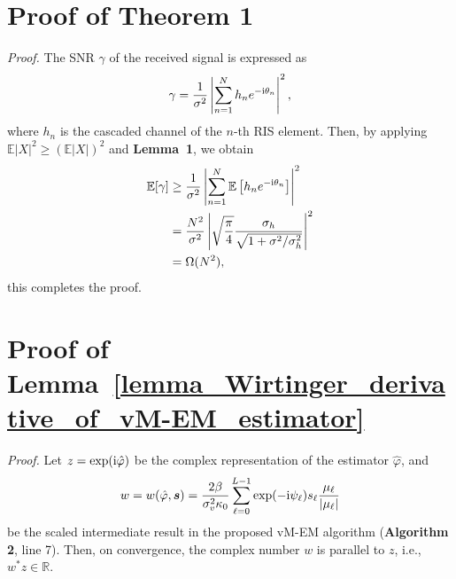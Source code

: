 \documentclass[a4paper,12pt]{article}
\def \ri {{\rm i}}
\begin{document}
\section{Proof of Theorem 1}
{\it {Proof.}} The SNR $\gamma$ of the received signal is expressed as 
\begin{equation}
    \gamma = \frac{1}{\sigma^2}\left| \sum_{n=1}^{N}h_n e^{-\ri \theta_n} \right|^2,
\end{equation}
where $h_n$ is the cascaded channel of the $n$-th RIS element. Then, by applying $\mathbb{E}|X|^2\geq (\mathbb{E}|X|)^2$ and {\bf Lemma~1}, we obtain 
\begin{equation}
    \begin{aligned}
    \mathbb{E}[\gamma] &\geq \frac{1}{\sigma^2}\left| \sum_{n=1}^{N}\mathbb{E}\left[h_n e^{-\ri \theta_n}\right] \right|^2 \\
    &= \frac{N^2}{\sigma^2} \left| \sqrt{\frac{\pi}{4}}\frac{\sigma_h}{\sqrt{1+\sigma^2/\sigma_h^2}} \right|^2 \\
    &= \Omega(N^2),
    \end{aligned}
\end{equation}
this completes the proof. 

\section{Proof of Lemma~\ref{lemma_Wirtinger_derivative_of_vM-EM_estimator}}
{\it {Proof.}}
Let $z=\exp(\ri \hat{\varphi})$ be the complex representation of the estimator $\hat\varphi$, and 
\begin{equation}
    w = w(\hat{\varphi}, {\bm s}) = \frac{2\beta}{\sigma_v^2 \kappa_0}\sum_{\ell=0}^{L-1}\exp(-\ri \psi_\ell) s_\ell \frac{\mu_\ell}{|\mu_\ell|} 
\end{equation}
be the scaled intermediate result in the proposed vM-EM algorithm ({\bf Algorithm 2}, line 7). Then, on convergence, the complex number $w$ is parallel to $z$, i.e., $w^*z\in\mathbb{R}$. 
\end{document}
